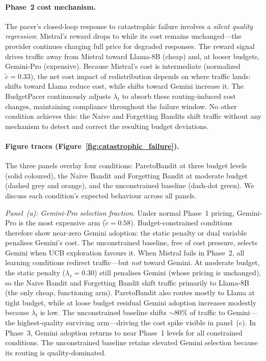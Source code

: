 \paragraph{Phase~2 cost mechanism.}
The pacer's closed-loop response to catastrophic failure involves a
\emph{silent quality regression}: Mistral's reward drops to
\cfFailureReward{} while its cost remains unchanged---the provider
continues charging full price for degraded responses.
The reward signal drives traffic away from Mistral toward Llama-8B
(cheap) and, at looser budgets, Gemini-Pro (expensive).  Because
Mistral's cost is intermediate (normalized $\tilde{c}{=}0.33$), the
net cost impact of redistribution depends on where traffic lands: shifts
toward Llama reduce cost, while shifts toward Gemini increase it.
The BudgetPacer continuously adjusts $\lambda_t$ to absorb these
routing-induced cost changes, maintaining compliance throughout the
failure window.
No other condition achieves this: the Naive and Forgetting Bandits
shift traffic without any mechanism to detect and correct the
resulting budget deviations.

\paragraph{Figure traces (Figure~\ref{fig:catastrophic_failure}).}
The three panels overlay four conditions: ParetoBandit at three
budget levels (solid coloured), the Naive Bandit and Forgetting
Bandit at moderate budget (dashed grey and orange), and the
unconstrained baseline (dash-dot green).  We discuss each
condition's expected behaviour across all panels.

\emph{Panel~(a): Gemini-Pro selection fraction.}
Under normal Phase~1 pricing, Gemini-Pro is the most expensive arm
($\tilde{c}{=}0.58$).  Budget-constrained conditions therefore show
near-zero Gemini adoption: the static penalty or dual variable
penalises Gemini's cost.  The unconstrained baseline, free of cost
pressure, selects Gemini when UCB exploration favours it.
When Mistral fails in Phase~2, all learning conditions redirect
traffic---but \emph{not} toward Gemini.  At moderate budget, the
static penalty ($\lambda_s{=}0.30$) still penalises Gemini
(whose pricing is unchanged), so the Naive Bandit and Forgetting
Bandit shift traffic primarily to Llama-8B (the only cheap,
functioning arm).  ParetoBandit also routes mostly to Llama at
tight budget, while at loose budget residual Gemini adoption
increases modestly because $\lambda_t$ is low.
The unconstrained baseline shifts ${\sim}80\%$ of traffic to
Gemini---the highest-quality surviving arm---driving the cost
spike visible in panel~(c).
In Phase~3, Gemini adoption returns to near Phase~1 levels for all
constrained conditions.  The unconstrained baseline retains elevated
Gemini selection because its routing is quality-dominated.

